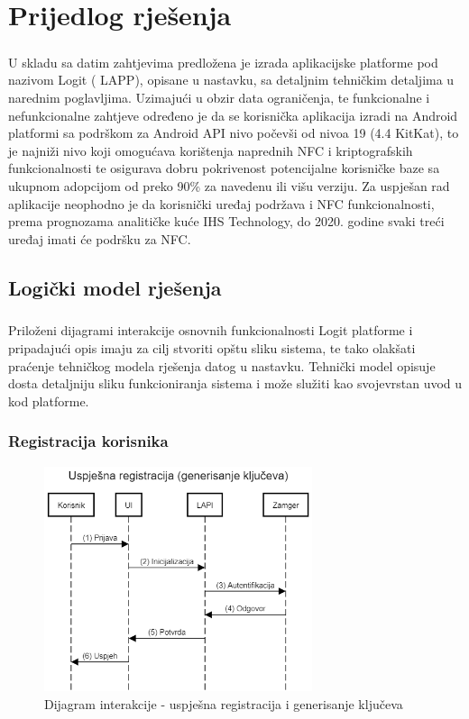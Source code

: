 \chapter{Prijedlog rješenja}
\paragraph*{}
U skladu sa datim zahtjevima predložena je izrada aplikacijske platforme pod nazivom Logit (
\gls{LAPP}), opisane u nastavku, sa detaljnim tehničkim detaljima u narednim poglavljima. Uzimajući u obzir data ograničenja, te funkcionalne i nefunkcionalne zahtjeve određeno je da se korisnička aplikacija izradi na Android platformi sa podrškom za Android API nivo počevši od nivoa 19 (4.4 KitKat), to je najniži nivo koji omogućava korištenja naprednih NFC i kriptografskih funkcionalnosti te osigurava dobru pokrivenost potencijalne korisničke baze sa ukupnom adopcijom od preko 90\% za navedenu ili višu verziju\cite{droidstats}. Za uspješan rad aplikacije neophodno je da korisnički uređaj podržava i NFC funkcionalnosti, prema prognozama analitičke kuće IHS Technology, do 2020. godine svaki treći uređaj imati će podršku za NFC.\cite{nfcforecast}

\section{Logički model rješenja}
\paragraph*{}
Priloženi dijagrami interakcije osnovnih funkcionalnosti Logit platforme i pripadajući opis imaju za cilj stvoriti opštu sliku sistema, te tako olakšati praćenje tehničkog modela rješenja datog u nastavku. Tehnički model opisuje dosta detaljniju sliku funkcioniranja sistema i može služiti kao svojevrstan uvod u kod platforme.

\subsection*{Registracija korisnika}
\begin{figure}[H]
    \centering
    \includegraphics[width=0.7\textwidth]{material/dia/01_registracija}
    \caption{Dijagram interakcije - uspješna registracija i generisanje ključeva}
\end{figure}
